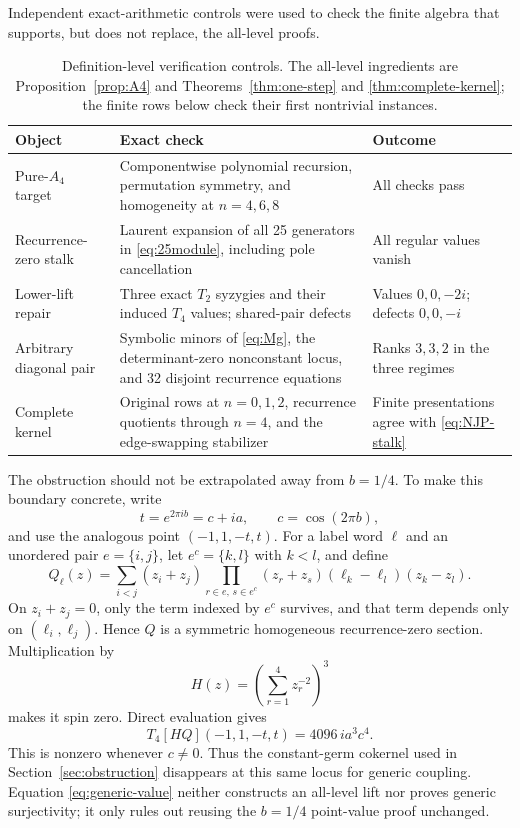 \documentclass[11pt,reqno]{amsart}
\theoremstyle{definition}
\theoremstyle{remark}
\begin{document}
Independent exact-arithmetic controls were used to check the finite algebra
that supports, but does not replace, the all-level proofs.
\begin{table}[ht]
\caption{Definition-level verification controls.  The all-level ingredients
are Proposition~\ref{prop:A4} and Theorems~\ref{thm:one-step} and
\ref{thm:complete-kernel}; the finite rows below check their first nontrivial
instances.}
\label{tab:checks}
\centering
\small
\begin{tabularx}{\textwidth}{>{\raggedright\arraybackslash}p{}X>{\raggedright\arraybackslash}p{}}
\toprule
Object & Exact check & Outcome\\
\midrule
Pure-$A_4$ target & Componentwise polynomial recursion, permutation symmetry,
and homogeneity at $n=4,6,8$ & All checks pass\\
Recurrence-zero stalk & Laurent expansion of all 25 generators in
\eqref{eq:25module}, including pole cancellation & All regular values vanish\\
Lower-lift repair & Three exact $T_2$ syzygies and their induced $T_4$ values;
shared-pair defects & Values $0,0,-2i$; defects $0,0,-i$\\
Arbitrary diagonal pair & Symbolic minors of \eqref{eq:Mg}, the
determinant-zero nonconstant locus, and 32 disjoint recurrence equations &
Ranks $3,3,2$ in the three regimes\\
Complete kernel & Original rows at $n=0,1,2$, recurrence quotients through
$n=4$, and the edge-swapping stabilizer & Finite presentations agree with
\eqref{eq:NJP-stalk}\\
\bottomrule
\end{tabularx}
\end{table}

The obstruction should not be extrapolated away from $b=1/4$.  To make this
boundary concrete, write
\begin{equation}
 t=e^{2\pi ib}=c+ia,
 \qquad c=\cos(2\pi b),
\end{equation}
and use the analogous point $(-1,1,-t,t)$.  For a label word $\ell$ and an
unordered pair $e=\{i,j\}$, let $e^c=\{k,l\}$ with $k<l$, and define
\begin{equation}
 Q_\ell(z)=\sum_{i<j}(z_i+z_j)
 \prod_{r\in e,\,s\in e^c}(z_r+z_s)
 (\ell_k-\ell_l)(z_k-z_l).
 \label{eq:generic-Q}
\end{equation}
On $z_i+z_j=0$, only the term indexed by $e^c$ survives, and that term depends
only on $(\ell_i,\ell_j)$.  Hence $Q$ is a symmetric homogeneous recurrence-zero
section.  Multiplication by
\begin{equation}
 H(z)=\left(\sum_{r=1}^4z_r^{-2}\right)^3
\end{equation}
makes it spin zero.  Direct evaluation gives
\begin{equation}
 T_4[HQ](-1,1,-t,t)=4096\,i a^3c^4.
 \label{eq:generic-value}
\end{equation}
This is nonzero whenever $c\ne0$.  Thus the constant-germ cokernel used in
Section~\ref{sec:obstruction} disappears at this same locus for generic
coupling.  Equation \eqref{eq:generic-value} neither constructs an all-level
lift nor proves generic surjectivity; it only rules out reusing the
$b=1/4$ point-value proof unchanged.
\end{document}
